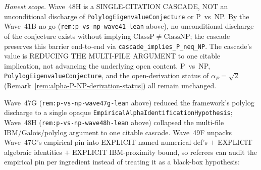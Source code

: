 \begin{remark}
\emph{Honest scope.} Wave~48H is a SINGLE-CITATION CASCADE, NOT an unconditional discharge of \texttt{PolylogEigenvalueConjecture} or P~vs~NP. By the Wave~41B no-go (\texttt{rem:p-vs-np-wave41-lean} above), no unconditional discharge of the conjecture exists without implying $\mathrm{ClassP} \neq \mathrm{ClassNP}$; the cascade preserves this barrier end-to-end via \texttt{cascade\_implies\_P\_neq\_NP}. The cascade's value is REDUCING THE MULTI-FILE ARGUMENT to one citable implication, not advancing the underlying open content. P~vs~NP, \texttt{PolylogEigenvalueConjecture}, and the open-derivation status of $\alpha_P = \sqrt{2}$ (Remark~\ref{rem:alpha-P-NP-derivation-status}) all remain unchanged.
\end{remark}

\begin{remark}\label{rem:p-vs-np-wave49f-lean}
Wave~47G (\texttt{rem:p-vs-np-wave47g-lean} above) reduced the framework's polylog discharge to a single opaque \texttt{EmpiricalAlphaIdentificationHypothesis}; Wave~48H (\texttt{rem:p-vs-np-wave48h-lean} above) collapsed the multi-file IBM/Galois/polylog argument to one citable cascade. Wave~49F unpacks Wave~47G's empirical pin into EXPLICIT named numerical def's $+$ EXPLICIT algebraic identities $+$ EXPLICIT IBM-proximity bound, so referees can audit the empirical pin per ingredient instead of treating it as a black-box hypothesis:
\begin{itemize}

\end{itemize}
\end{remark}
